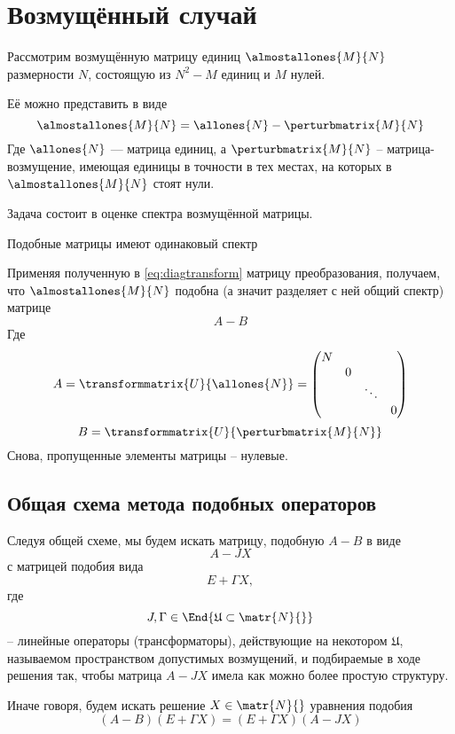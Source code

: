 \section{Возмущённый случай}

Рассмотрим возмущённую матрицу единиц
\( \almostallones{M}{N} \) размерности \( N \),
состоящую из \( N^2 - M \) единиц и \( M \) нулей.

Её можно представить в виде
\[
    \almostallones{M}{N} = \allones{N} - \perturbmatrix{M}{N}
    \]
Где \( \allones{N} \) --- матрица единиц,
а \( \perturbmatrix{M}{N} \) -- матрица-возмущение,
имеющая единицы в точности в тех местах,
на которых в \( \almostallones{M}{N} \) стоят нули.

Задача состоит в оценке спектра возмущённой матрицы.

\begin{lemma}
    Подобные матрицы имеют одинаковый спектр
\end{lemma}

Применяя полученную в \eqref{eq:diagtransform} матрицу преобразования,
получаем, что \( \almostallones{M}{N} \) подобна (а значит разделяет с ней общий спектр)
матрице
\[ A - B \]
Где
\[
    A = \transformmatrix{U}{\allones{N}}
    = \begin{pmatrix}
      N &   &        & \\
        & 0 &        & \\
        &   & \ddots & \\
        &   &        & 0
        \end{pmatrix}
        \]
\[
    B = \transformmatrix{U}{\perturbmatrix{M}{N}}
    \]
Снова, пропущенные элементы матрицы -- нулевые.

\subsection{Общая схема метода подобных операторов}
Следуя общей схеме, мы будем искать матрицу, подобную \( A - B \)
в виде
\[ A - J X \]
с матрицей подобия вида
\[ E + \Gamma X ,\]
где \[ J, \Gamma \in \End{\mathfrak U \subset \matr{N}{}} \]
-- линейные операторы (трансформаторы),
действующие на некотором \( \mathfrak U \),
называемом пространством допустимых возмущений,
и подбираемые в ходе решения так, чтобы матрица \( A - JX \)
имела как можно более простую структуру.

Иначе говоря, будем искать решение \( X \in\matr{N}{} \)
уравнения подобия
\begin{equation}\label{eq:similarity-orig}
    (A - B)(E+\Gamma X) = (E+\Gamma X) (A - JX)
\end{equation}


